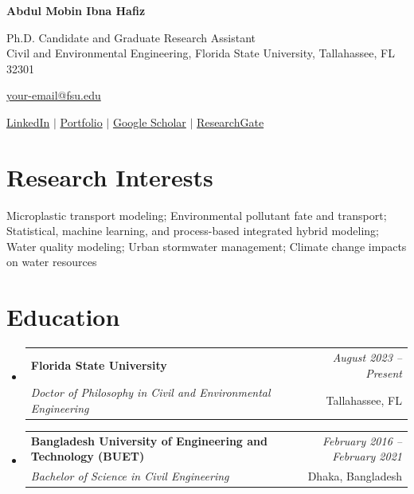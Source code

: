 \documentclass[a4paper,11pt]{article}
\makeatletter
\newcommand{\resumeSubheading}[4]{
\vspace{0.5mm}\item
    \begin{tabular*}{0.98\textwidth}[t]{l@{\extracolsep{\fill}}r}
        \textbf{#1} & \textit{\footnotesize{#4}} \\
        \textit{\footnotesize{#3}} &  \footnotesize{#2}\\
    \end{tabular*}
    \vspace{-2.4mm}
}
\newcommand{\resumeSubHeadingListStart}{\begin{itemize}[leftmargin=*,labelsep=1mm]}
\newcommand{\resumeSubHeadingListEnd}{\end{itemize}\vspace{2mm}}
\newcommand{\headerfontiii}{\fontfamily{ppl}\selectfont} %
\makeatother
\begin{document}
\headerfontiii

\begin{center}
    {\Huge\textbf{Abdul Mobin Ibna Hafiz}}
\end{center}
\vspace{-5mm}
\begin{center}
    \small{
    Ph.D. Candidate and Graduate Research Assistant\\
    Civil and Environmental Engineering, Florida State University, Tallahassee, FL 32301
    }
\end{center}
\vspace{-4mm}
\begin{center}
    \small{
    \href{mailto:your-email@fsu.edu}{your-email@fsu.edu}
    }
\end{center}
\vspace{-5mm}
\begin{center}
    \small{
    \href{https://your-linkedin-url}{LinkedIn} $|$
    \href{https://your-portfolio-url}{Portfolio} $|$
    \href{https://your-google-scholar-url}{Google Scholar} $|$
    \href{https://your-researchgate-url}{ResearchGate}
    }
\end{center}
\vspace{-4mm}

\section{\textbf{Research Interests}}
\vspace{1mm}
\small{
Microplastic transport modeling; Environmental pollutant fate and transport; Statistical, machine learning, and process-based integrated hybrid modeling; Water quality modeling; Urban stormwater management; Climate change impacts on water resources
}
\vspace{-2mm}

\section{\textbf{Education}}
\vspace{-0.4mm}
\resumeSubHeadingListStart
\resumeSubheading
{Florida State University}{Tallahassee, FL}
{Doctor of Philosophy in Civil and Environmental Engineering}{August 2023 -- Present}
\resumeSubheading
{Bangladesh University of Engineering and Technology (BUET)}{Dhaka, Bangladesh}
{Bachelor of Science in Civil Engineering}{February 2016 -- February 2021}
\resumeSubHeadingListEnd
\vspace{-6mm}
\end{document}
